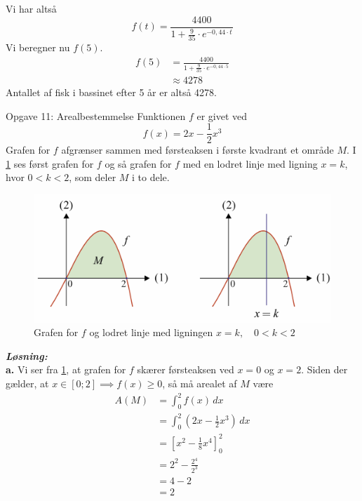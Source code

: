 \documentclass{article}
\newcommand{\sol}{\setlength{\parindent}{0cm}\textbf{\textit{Løsning:}}\setlength{\parindent}{1cm}}
\begin{document}
Vi har altså 
\[
f(t)=\frac{4400}{1+\frac{9}{35}\cdot e^{-0,44 \cdot t} }
\] 
Vi beregner nu $f(5)$.
\begin{equation*}
\begin{split}
  f(5)&=\frac{4400}{1+\frac{9}{35}\cdot e^{-0,44 \cdot 5} }\\
  &\approx 4278
\end{split}
\end{equation*}
Antallet af fisk i bassinet efter 5 år er altså 4278.
\begin{question}{Opgave 11: Arealbestemmelse}{}
  Funktionen $f$ er givet ved
  \[
  f(x)= 2x-\frac{1}{2}x^3
  \] 
Grafen for $f$ afgrænser sammen med førsteaksen i første kvadrant et område $M$.
  I \cref{fig:f} ses først grafen for $f$ og så grafen for $f$ med en lodret linje med ligning $x=k$, hvor $0<k<2$, som deler $M$ i to dele.
\end{question}
\begin{figure}[H]
\begin{center}
  \includegraphics[width=\textwidth]{f.png}
\end{center}
  \caption{Grafen for $f$ og lodret linje med ligningen $x=k, \quad 0<k<2$}
\label{fig:f}
\end{figure}
\sol \\
\textbf{a.}
Vi ser fra \cref{fig:f}, at grafen for $f$ skærer førsteaksen ved $x=0$ og $x=2$. 
Siden der gælder, at $x \in [0;2] \implies f(x) \geq 0$, så må arealet af $M$ være
\begin{equation*}
\begin{split}
  A(M)&=\int_{0}^{2} f(x) \,dx \\
  &=\int_{0}^{2} \left(2x - \frac{1}{2}x^3\right)  \,dx \\
  &=\left[x^2-\frac{1}{8}x^4\right]_0^2\\
  &=2^2-\frac{2^4}{2^3}\\
  &=4-2\\
  &=2
\end{split}
\end{equation*}
\end{document}
